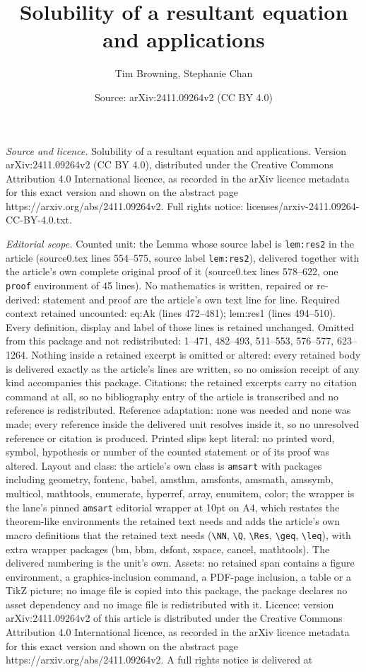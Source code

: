 \documentclass[10pt,a4paper]{amsart}
\title[Solubility of a resultant equation and applications]{Solubility of a resultant equation and applications}
\author{Tim Browning, Stephanie Chan}
\date{Source: arXiv:2411.09264v2 (CC BY 4.0)}
\begin{document}
\maketitle

\noindent\emph{Source and licence.} Solubility of a resultant equation and applications. Version arXiv:2411.09264v2 (CC BY 4.0), distributed under the Creative Commons Attribution 4.0 International licence, as recorded in the arXiv licence metadata for this exact version and shown on the abstract page https://arxiv.org/abs/2411.09264v2. Full rights notice: licenses/arxiv-2411.09264-CC-BY-4.0.txt.\par\smallskip

\noindent\textit{Editorial scope.} Counted unit: the Lemma whose source label is \texttt{lem:res2} in the article (source0.tex lines 554--575, source label \texttt{lem:res2}), delivered together with the article's own complete original proof of it (source0.tex lines 578--622, one \texttt{proof} environment of 45 lines). No mathematics is written, repaired or re-derived: statement and proof are the article's own text line for line. Required context retained uncounted: eq:Ak (lines 472--481); lem:res1 (lines 494--510). Every definition, display and label of those lines is retained unchanged. Omitted from this package and not redistributed: 1--471, 482--493, 511--553, 576--577, 623--1264. Nothing inside a retained excerpt is omitted or altered: every retained body is delivered exactly as the article's lines are written, so no omission receipt of any kind accompanies this package. Citations: the retained excerpts carry no citation command at all, so no bibliography entry of the article is transcribed and no reference is redistributed. Reference adaptation: none was needed and none was made; every reference inside the delivered unit resolves inside it, so no unresolved reference or citation is produced. Printed slips kept literal: no printed word, symbol, hypothesis or number of the counted statement or of its proof was altered. Layout and class: the article's own class is \texttt{amsart} with packages including geometry, fontenc, babel, amsthm, amsfonts, amsmath, amssymb, multicol, mathtools, enumerate, hyperref, array, enumitem, color; the wrapper is the lane's pinned \texttt{amsart} editorial wrapper at 10pt on A4, which restates the theorem-like environments the retained text needs and adds the article's own macro definitions that the retained text needs (\texttt{\textbackslash NN}, \texttt{\textbackslash Q}, \texttt{\textbackslash Res}, \texttt{\textbackslash geq}, \texttt{\textbackslash leq}), with extra wrapper packages (bm, bbm, dsfont, xspace, cancel, mathtools). The delivered numbering is the unit's own. Assets: no retained span contains a figure environment, a graphics-inclusion command, a PDF-page inclusion, a table or a TikZ picture; no image file is copied into this package, the package declares no asset dependency and no image file is redistributed with it. Licence: version arXiv:2411.09264v2 of this article is distributed under the Creative Commons Attribution 4.0 International licence, as recorded in the arXiv licence metadata for this exact version and shown on the abstract page https://arxiv.org/abs/2411.09264v2. A full rights notice is delivered at 
\end{document}

